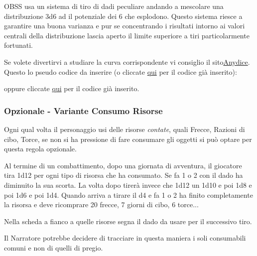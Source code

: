 \begin{multicols}{2}
OBSS usa un sistema di tiro di dadi peculiare andando a mescolare una distribuzione 3d6 ad il potenziale dei 6 che esplodono. Questo sistema riesce a garantire una buona varianza e pur se concentrando i risultati intorno ai valori centrali della distribuzione lascia aperto il limite superiore a tiri particolarmente fortunati.

Se volete divertirvi a studiare la curva corrispondente vi consiglio il sito\href{https://anydice.com/}{Anydice}. Questo lo pseudo codice da inserire (o cliccate \href{https://anydice.com/program/2610e}{qui} per il codice già inserito):

\medskip


\medskip

oppure cliccate \href{https://anydice.com/program/2610e}{qui} per il codice già inserito.

\subsubsection{Opzionale - Variante Consumo Risorse}\label{varianteconsumorisorse}\hypertarget{varianteconsumorisorse}{}

Ogni qual volta il personaggio usi delle risorse \emph{contate}, quali Frecce, Razioni di cibo, Torce, se non si ha pressione di fare consumare gli oggetti si può optare per questa regola opzionale.

Al termine di un combattimento, dopo una giornata di avventura, il giocatore tira 1d12 per ogni tipo di risorsa che ha consumato. Se fa 1 o 2 con il dado ha diminuito la sua scorta.
La volta dopo tirerà invece che 1d12 un 1d10 e poi 1d8 e poi 1d6 e poi 1d4. Quando arriva a tirare il d4 e fa 1 o 2 ha finito completamente la risorsa e deve ricomprare 20 frecce, 7 giorni di cibo, 6 torce...

Nella scheda a fianco a quelle risorse segna il dado da usare per il successivo tiro.

Il Narratore potrebbe decidere di tracciare in questa maniera i soli consumabili comuni e non di quelli di pregio.


\end{multicols}
